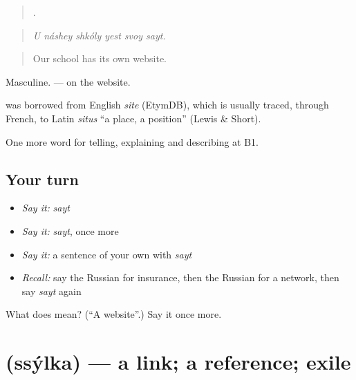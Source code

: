 \begin{quote}
     .
\end{quote}

\begin{quote}
\emph{U náshey shkóly yest svoy sayt.}
\end{quote}

\begin{quote}
Our school has its own website.
\end{quote}

Masculine. \emph{ } — on the website.

\begin{cousinweb}
\textbf{} was borrowed from English \emph{site} (EtymDB), which is usually traced, through French, to Latin \emph{situs} \textquotedblleft{}a place, a position\textquotedblright{} (Lewis \& Short).
\end{cousinweb}

\begin{grammarlens}[title={What you've built}]
One more word for telling, explaining and describing at B1.
\end{grammarlens}

\subsection*{Your turn}
\begin{itemize}
\raggedright
  \item \emph{Say it:} \emph{sayt}
  \item \emph{Say it:} \emph{sayt}, once more
  \item \emph{Say it:} a sentence of your own with \emph{sayt}
  \item \emph{Recall:} say the Russian for insurance, then the Russian for a network, then say \emph{sayt} again
\end{itemize}

\begin{tcolorbox}[breakable,colback=teal!4,colframe=teal!35!black,title={Before you move on}]
What does  mean? (\textquotedblleft{}A website\textquotedblright{}.) Say it once more.
\end{tcolorbox}
\section[\texorpdfstring{\ru{ссылка} (ssýlka)}{ссылка (ssýlka)}]{ (ssýlka) — a link; a reference; exile}

